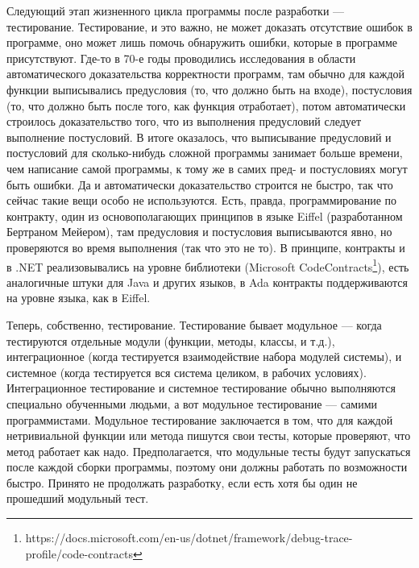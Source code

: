 \documentclass[a5paper]{article}
\begin{document}
Следующий этап жизненного цикла программы после разработки --- тестирование. Тестирование, и это важно, не может доказать отсутствие ошибок в программе, оно может лишь помочь обнаружить ошибки, которые в программе присутствуют. Где-то в 70-е годы проводились исследования в области автоматического доказательства корректности программ, там обычно для каждой функции выписывались предусловия (то, что должно быть на входе), постусловия (то, что должно быть после того, как функция отработает), потом автоматически строилось доказательство того, что из выполнения предусловий следует выполнение постусловий. В итоге оказалось, что выписывание предусловий и постусловий для сколько-нибудь сложной программы занимает больше времени, чем написание самой программы, к тому же в самих пред- и постусловиях могут быть ошибки. Да и автоматически доказательство строится не быстро, так что сейчас такие вещи особо не используются. Есть, правда, программирование по контракту, один из основополагающих принципов в языке Eiffel (разработанном Бертраном Мейером), там предусловия и постусловия выписываются явно, но проверяются во время выполнения (так что это не то). В принципе, контракты и в .NET реализовывались на уровне библиотеки (Microsoft CodeContracts\footnote{https://docs.microsoft.com/en-us/dotnet/framework/debug-trace-profile/code-contracts}), есть аналогичные штуки для Java и других языков, в Ada контракты поддерживаются на уровне языка, как в Eiffel.

Теперь, собственно, тестирование. Тестирование бывает модульное --- когда тестируются отдельные модули (функции, методы, классы, и т.д.), интеграционное (когда тестируется взаимодействие набора модулей системы), и системное (когда тестируется вся система целиком, в рабочих условиях). Интеграционное тестирование и системное тестирование обычно выполняются специально обученными людьми, а вот модульное тестирование --- самими программистами. Модульное тестирование заключается в том, что для каждой нетривиальной функции или метода пишутся свои тесты, которые проверяют, что метод работает как надо. Предполагается, что модульные тесты будут запускаться после каждой сборки программы, поэтому они должны работать по возможности быстро. Принято не продолжать разработку, если есть хотя бы один не прошедший модульный тест.
\end{document}
